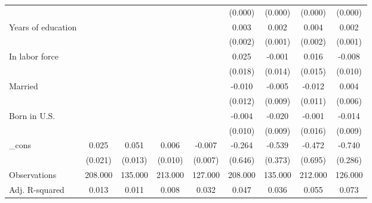 \begin{table}[htbp]
{\begin{tabular}{l*{8}{c}}
          &                  &                  &                  &                  &  (0.000)         &  (0.000)         &  (0.000)         &  (0.000)         \\
Years of education&                  &                  &                  &                  &    0.003         &    0.002         &    0.004\sym{*}  &    0.002\sym{**} \\
          &                  &                  &                  &                  &  (0.002)         &  (0.001)         &  (0.002)         &  (0.001)         \\
In labor force&                  &                  &                  &                  &    0.025         &   -0.001         &    0.016         &   -0.008         \\
          &                  &                  &                  &                  &  (0.018)         &  (0.014)         &  (0.015)         &  (0.010)         \\
Married   &                  &                  &                  &                  &   -0.010         &   -0.005         &   -0.012         &    0.004         \\
          &                  &                  &                  &                  &  (0.012)         &  (0.009)         &  (0.011)         &  (0.006)         \\
Born in U.S.&                  &                  &                  &                  &   -0.004         &   -0.020\sym{**} &   -0.001         &   -0.014         \\
          &                  &                  &                  &                  &  (0.010)         &  (0.009)         &  (0.016)         &  (0.009)         \\
\_cons    &    0.025         &    0.051\sym{***}&    0.006         &   -0.007         &   -0.264         &   -0.539         &   -0.472         &   -0.740\sym{**} \\
          &  (0.021)         &  (0.013)         &  (0.010)         &  (0.007)         &  (0.646)         &  (0.373)         &  (0.695)         &  (0.286)         \\
\midrule
Observations&  208.000         &  135.000         &  213.000         &  127.000         &  208.000         &  135.000         &  212.000         &  126.000         \\
Adj. R-squared&    0.013         &    0.011         &    0.008         &    0.032         &    0.047         &    0.036         &    0.055         &    0.073         \\

\end{tabular}}
\end{table}
